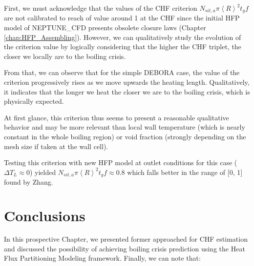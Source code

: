 \npar

First, we must acknowledge that the values of the CHF criterion $N_{sit,a} \pi \left<R\right>^{2} t_{g}f$ are not calibrated to reach of value around 1 at the CHF since the initial HFP model of NEPTUNE\_CFD presents obsolete closure laws (Chapter \ref{chap:HFP_Assembling}). However, we can qualitatively study the evolution of the criterion value by logically considering that the higher the CHF triplet, the closer we locally are to the boiling crisis.

\npar

From that, we can observe that for the simple DEBORA case, the value of the criterion progressively rises as we move upwards the heating length. Qualitatively, it indicates that the longer we heat the closer we are to the boiling crisis, which is physically expected. 

\npar

At first glance, this criterion thus seems to present a reasonable qualitative behavior and may be more relevant than local wall temperature (which is nearly constant in the whole boiling region) or void fraction (strongly depending on the mesh size if taken at the wall cell).

\begin{remark*}{}
Testing this criterion with new HFP model at outlet conditions for this case ($\Delta T_{L} \approx 0$) yielded $N_{sit,a} \pi \left<R\right>^{2} t_{g}f \approx 0.8$ which falls better in the range of [0, 1] found by Zhang.
\end{remark*}


\section{Conclusions}

In this prospective Chapter, we presented former approached for CHF estimation and discussed the possibility of achieving boiling crisis prediction using the Heat Flux Partitioning Modeling framework. Finally, we can note that:


